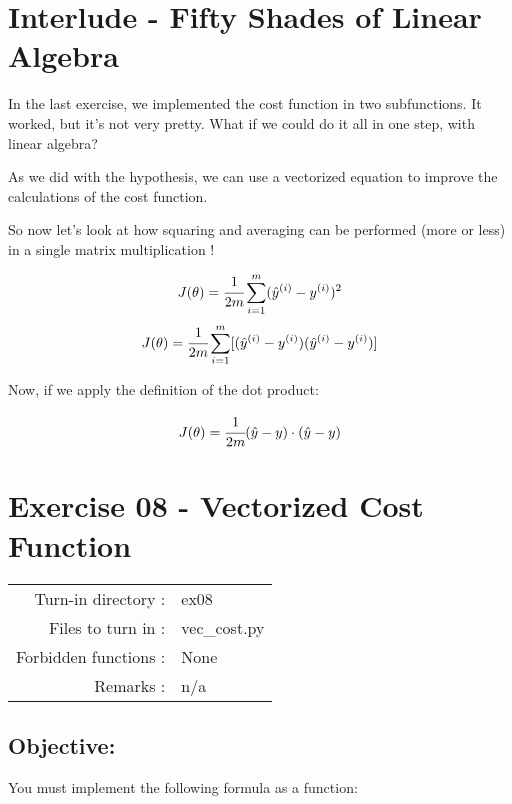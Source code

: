 \documentclass[]{article}
\begin{document}
\clearpage

\hypertarget{interlude---fifty-shades-of-linear-algebra-1}{%
\section{Interlude - Fifty Shades of Linear
Algebra}\label{interlude---fifty-shades-of-linear-algebra-1}}

In the last exercise, we implemented the cost function in two
subfunctions. It worked, but it's not very pretty. What if we could do
it all in one step, with linear algebra?

As we did with the hypothesis, we can use a vectorized equation to
improve the calculations of the cost function.

So now let's look at how squaring and averaging can be performed (more
or less) in a single matrix multiplication !

\large

\[
J(\theta) = \cfrac{1}{2m}\sum_{i=1}^{m}(\hat{y}^{(i)} - y^{(i)})^2
\] \normalsize \large \[
J(\theta) = \cfrac{1}{2m}\sum_{i=1}^{m}[(\hat{y}^{(i)} - y^{(i)}) (\hat{y}^{(i)} - y^{(i)})]
\] \normalsize

Now, if we apply the definition of the dot product:

\large

\[
J(\theta) = \cfrac{1}{2m}(\hat{y} - y) \cdot(\hat{y}- y)
\] \normalsize \clearpage

\hypertarget{exercise-08---vectorized-cost-function-1}{%
\section{Exercise 08 - Vectorized Cost
Function}\label{exercise-08---vectorized-cost-function-1}}

\begin{longtable}[]{@{}rl@{}}
\toprule
\endhead
Turn-in directory : & ex08\tabularnewline
Files to turn in : & vec\_cost.py\tabularnewline
Forbidden functions : & None\tabularnewline
Remarks : & n/a\tabularnewline
\bottomrule
\end{longtable}

\hypertarget{objective-5}{%
\subsection{Objective:}\label{objective-5}}

You must implement the following formula as a function:

\large
\end{document}
